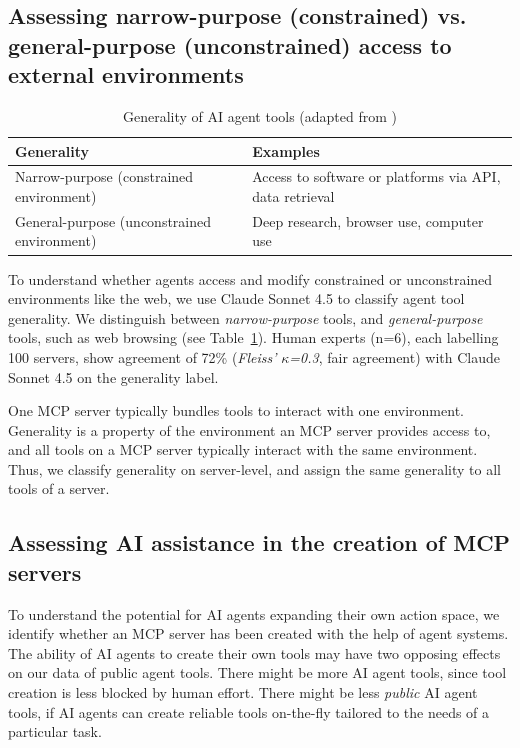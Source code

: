 \documentclass[manuscript,screen,nonacm,oneside]{acmart}
\begin{document}
\subsection{Assessing narrow-purpose (constrained) vs. general-purpose (unconstrained) access to external environments}
\label{sec:generality}

\begin{table}[htbp]
\centering
\caption{Generality of AI agent tools (adapted from \citet{CAISI2025})}
\small
\begin{tabular}{ll}
\toprule
\textbf{Generality} & \textbf{Examples} \\
\midrule
Narrow-purpose (constrained environment) & Access to software or platforms via API, data retrieval \\
General-purpose (unconstrained environment) & Deep research, browser use, computer use \\
\bottomrule
\end{tabular}
\label{tab:generality}
\end{table}
To understand whether agents access and modify constrained or unconstrained environments like the web, we use Claude Sonnet 4.5 to classify agent tool generality. We distinguish between \emph{narrow-purpose} tools, and \emph{general-purpose} tools, such as web browsing (see Table~\ref{tab:generality}).
Human experts (n=6), each labelling 100 servers, show agreement of 72\% (\emph{Fleiss'} \(\kappa\)\emph{=0.3}, fair agreement) with Claude Sonnet 4.5 on the generality label.

One MCP server typically bundles tools to interact with one environment. Generality is a property of the environment an MCP server provides access to, and all tools on a MCP server typically interact with the same environment. Thus, we classify generality on server-level, and assign the same generality to all tools of a server.

\subsection{Assessing AI assistance in the creation of MCP servers}
\label{sec:ai-detection-method}

To understand the potential for AI agents expanding their own action space, we identify whether an MCP server has been created with the help of agent systems. The ability of AI agents to create their own tools may have two opposing effects on our data of public agent tools. There might be more AI agent tools, since tool creation is less blocked by human effort. There might be less \textit{public} AI agent tools, if AI agents can create reliable tools on-the-fly tailored to the needs of a particular task.
\end{document}
